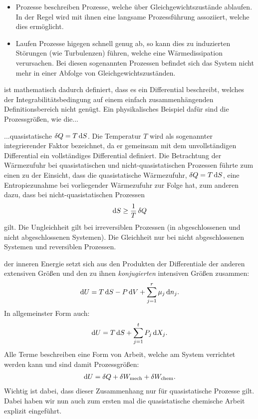 \begin{summary}
    \begin{itemize}
        \item {} Prozesse beschreiben Prozesse, welche über Gleichgewichtszustände ablaufen. In der Regel wird mit ihnen eine langsame Prozessführung assoziiert, welche dies ermöglicht.
        \item Laufen Prozesse higegen schnell genug ab, so kann dies zu induzierten Störungen (wie Turbulenzen) führen, welche eine Wärmedissipation verursachen. Bei diesen sogenannten  Prozessen befindet sich das System nicht mehr in einer Abfolge von Gleichgewichtszuständen.
    \end{itemize}

     ist mathematisch dadurch definiert, dass es ein Differential beschreibt, welches der Integrabilitätsbedingung auf einem einfach zusammenhängenden Definitionsbereich nicht genügt.
    Ein physikalisches Beispiel dafür sind die Prozessgrößen, wie die...
    
    ...quasistatische  $\mathop{}\!\delta Q=T\mathop{}\!\mathrm{d} S$. Die Temperatur $T$ wird als sogenannter integrierender Faktor bezeichnet, da er gemeinsam mit dem unvollständigen Differential ein vollständiges Differential definiert. Die Betrachtung der Wärmezufuhr bei quasistatischen und nicht-quasistatischen Prozessen führte zum einen zu der Einsicht, dass die quasistatische Wärmezufuhr, $\mathop{}\!\delta Q=T\mathop{}\!\mathrm{d} S$, eine Entropiezunahme bei vorliegender Wärmezufuhr zur Folge hat, zum anderen dazu, dass bei nicht-quasistatischen Prozessen
    \begin{align*}
        \mathop{}\!\mathrm{d} S\geq \frac{1}{T}\mathop{}\!\delta Q
    \end{align*}
    gilt. Die Ungleichheit gilt bei irreversiblen Prozessen (in abgeschlossenen und nicht abgeschlossenen Systemen). Die Gleichheit nur bei nicht abgeschlossenen Systemen und reversiblen Prozessen.

    der inneren Energie setzt sich aus den Produkten der Differentiale der anderen extensiven Größen und den zu ihnen \emph{konjugierten} intensiven Größen zusammen:
    \begin{align*}
        \mathop{}\!\mathrm{d} U = T \mathop{}\!\mathrm{d} S - P \mathop{}\!\mathrm{d} V + \sum_{j=1}^r \mu_j \mathop{}\!\mathrm{d} n_j.
    \end{align*}
    In allgemeinster Form auch:
    \begin{align*}
        \mathop{}\!\mathrm{d} U = T\mathop{}\!\mathrm{d} S+\sum_{j=1}^{t}P_j\mathop{}\!\mathrm{d} X_j.
    \end{align*}
    Alle Terme beschreiben eine Form von Arbeit, welche am System verrichtet werden kann und sind damit Prozessgrößen:
    \begin{align*}
        \mathop{}\!\mathrm{d} U = \mathop{}\!\delta Q + \mathop{}\!\delta W_\mathrm{mech} + \mathop{}\!\delta W_\mathrm{chem}.
    \end{align*}
    Wichtig ist dabei, dass dieser Zusammenhang nur für quasistatische Prozesse gilt. Dabei haben wir nun auch zum ersten mal die quasistatische chemische Arbeit explizit eingeführt.


\end{summary}
